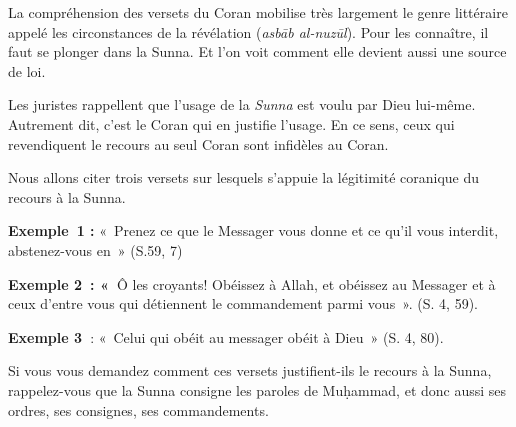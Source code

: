 La compréhension des versets du Coran mobilise très largement le genre
littéraire appelé les circonstances de la révélation (\emph{asbāb
al-nuzūl}). Pour les connaître, il faut se plonger dans la Sunna. Et
l'on voit comment elle devient aussi une source de loi.


Les juristes rappellent que l'usage de la \emph{Sunna} est voulu par
Dieu lui-même. Autrement dit, c'est le Coran qui en justifie l'usage. En
ce sens, ceux qui revendiquent le recours au seul Coran sont infidèles
au Coran.


Nous allons citer trois versets sur lesquels s'appuie la légitimité
coranique du recours à la Sunna.

\textbf{Exemple~1 :} «~Prenez ce que le Messager vous donne et ce qu'il
vous interdit, abstenez-vous en~» (S.59, 7)


\textbf{Exemple 2~: «~}Ô les croyants! Obéissez à Allah, et obéissez au
Messager et à ceux d'entre vous qui détiennent le commandement parmi
vous~». (S. 4, 59).


\textbf{Exemple 3~}: «~Celui qui obéit au messager obéit à Dieu~» (S. 4,
80).


Si vous vous demandez comment ces versets justifient-ils le recours à la
Sunna, rappelez-vous que la Sunna consigne les paroles de Muḥammad, et
donc aussi ses ordres, ses consignes, ses commandements.

